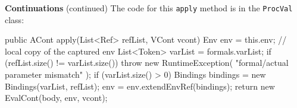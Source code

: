 \begin{minipage}[t]{\sw}
\slidenumber
\LARGE
{\bf Continuations} (continued)\exx
The code for this \verb'apply' method is in the \verb'ProcVal' class:
\Large
\begin{qv}
    public ACont apply(List<Ref> refList, VCont vcont) {
        Env env = this.env; // local copy of the captured env
        List<Token> varList = formals.varList;
        if (refList.size() != varList.size())
            throw new RuntimeException(
                "formal/actual parameter mismatch"
            );
        if (varList.size() > 0) {
            Bindings bindings = new Bindings(varList, refList);
            env = env.extendEnvRef(bindings);
        }
        return new EvalCont(body, env, vcont);
    }
\end{qv}
\end{minipage}
